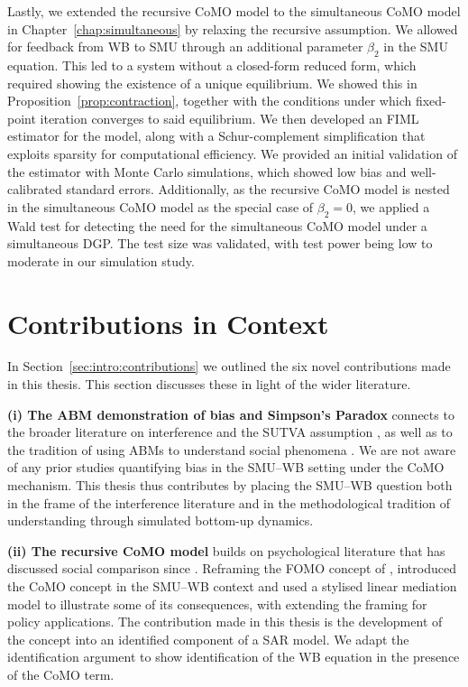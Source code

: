 Lastly, we extended the recursive CoMO model to the simultaneous CoMO model in Chapter~\ref{chap:simultaneous} by relaxing the recursive assumption. We allowed for feedback from WB to SMU through an additional parameter $\beta_2$ in the SMU equation. This led to a system without a closed-form reduced form, which required showing the existence of a unique equilibrium. We showed this in Proposition~\ref{prop:contraction}, together with the conditions under which fixed-point iteration converges to said equilibrium. We then developed an FIML estimator for the model, along with a Schur-complement simplification that exploits sparsity for computational efficiency. We provided an initial validation of the estimator with Monte Carlo simulations, which showed low bias and well-calibrated standard errors. Additionally, as the recursive CoMO model is nested in the simultaneous CoMO model as the special case of $\beta_2 = 0$, we applied a Wald test for detecting the need for the simultaneous CoMO model under a simultaneous DGP\@. The test size was validated, with test power being low to moderate in our simulation study.

\section{Contributions in Context}
\label{sec:discussion_conclusion:contributions}
In Section~\ref{sec:intro:contributions} we outlined the six novel contributions made in this thesis. This section discusses these in light of the wider literature.

\textbf{(i) The ABM demonstration of bias and Simpson's Paradox} connects to the broader literature on interference and the SUTVA assumption \parencite[Sec.~2.1]{HudgensHalloran2008}, as well as to the tradition of using ABMs to understand social phenomena \parencite{Macy2002}. We are not aware of any prior studies quantifying bias in the SMU--WB setting under the CoMO mechanism. This thesis thus contributes by placing the SMU--WB question both in the frame of the interference literature and in the methodological tradition of understanding through simulated bottom-up dynamics.

\textbf{(ii) The recursive CoMO model} builds on psychological literature that has discussed social comparison since \textcite{Festinger1954}. Reframing the FOMO concept of \textcite[p.~1841]{Przybylski2013}, \textcite[Eqs.~1--2]{DahlFoldnesGronneberg2024} introduced the CoMO concept in the SMU--WB context and used a stylised linear mediation model to illustrate some of its consequences, with \textcite{DahlFoldnesGronneberg2026} extending the framing for policy applications. The contribution made in this thesis is the development of the concept into an identified component of a SAR model. We adapt the \textcite{Bramoulle2009} identification argument to show identification of the WB equation in the presence of the CoMO term.

